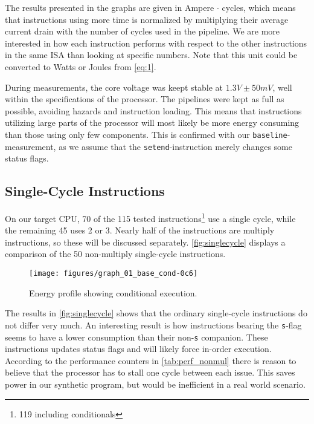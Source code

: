 The results presented in the graphs are given in Ampere $\cdot$ cycles, which
means that instructions using more time is normalized by multiplying their
average current drain with the number of cycles used in the pipeline. We are
more interested in how each instruction performs with respect to the other
instructions in the same ISA than looking at specific numbers. Note that this
unit could be converted to Watts or Joules from \autoref{eq:1}.

During measurements, the core voltage was keept stable at $1.3V\pm50mV$, well
within the specifications of the processor. The pipelines were kept as full as
possible, avoiding hazards and instruction loading. This means that instructions
utilizing large parts of the processor will most likely be more energy consuming
than those using only few components. This is confirmed with our
\texttt{baseline}-measurement, as we assume that the \texttt{setend}-instruction
merely changes some status flags.



\subsection{Single-Cycle Instructions}
On our target CPU, 70 of the 115 tested instructions\footnote{119 including
conditionals} use a single cycle, while the remaining 45 uses 2 or 3.  Nearly
half of the instructions are multiply instructions, so these will be discussed
separately. \autoref{fig:singlecycle} displays a comparison of the 50
non-multiply single-cycle instructions.

\begin{figure}
    \centering
    \texttt{[image: figures/graph\_01\_base\_cond-0c6]}
    \caption{Energy profile showing conditional execution.}
    \label{fig:cond}
\end{figure}

The results in \autoref{fig:singlecycle} shows that the ordinary single-cycle
instructions do not differ very much. An interesting result is how instructions
bearing the \texttt{s}-flag seems to have a lower consumption than their
non-\texttt{s} companion. These instructions updates status flags and will
likely force in-order execution.  According to the performance counters in
\autoref{tab:perf_nonmul} there is reason to believe that the processor has to
stall one cycle between each issue.  This saves power in our synthetic program,
but would be inefficient in a real world scenario.

